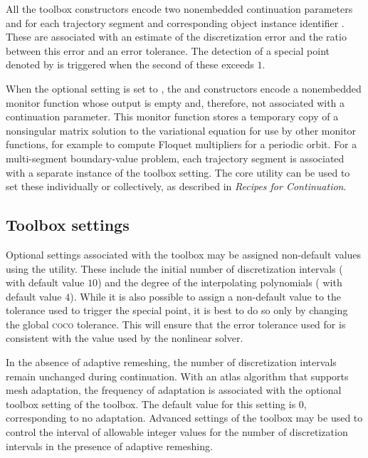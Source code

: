 All the  toolbox constructors encode two nonembedded continuation parameters  and  for each trajectory segment and corresponding object instance identifier . These are associated with an estimate of the discretization error and the ratio between this error and an error tolerance. The detection of  a special point denoted by  is triggered when the second of these exceeds $1$.

When the optional setting  is set to , the  and  constructors encode a nonembedded monitor function whose output is empty and, therefore, not associated with a continuation parameter. This monitor function stores a temporary copy of a nonsingular matrix solution to the variational equation for use by other monitor functions, for example to compute Floquet multipliers for a periodic orbit. For a multi-segment boundary-value problem, each trajectory segment is associated with a separate instance of the  toolbox setting. The  core utility can be used to set these individually or collectively, as described in \emph{Recipes for Continuation}.

\subsection{Toolbox settings}
Optional settings associated with the  toolbox may be assigned non-default values using the  utility. These include the initial number of discretization intervals ( with default value $10$) and the degree of the interpolating polynomials ( with default value $4$). While it is also possible to assign a non-default value to the tolerance used to trigger the  special point, it is best to do so only by changing the global \textsc{coco} tolerance. This will ensure that the error tolerance used for  is consistent with the value used by the nonlinear solver.

In the absence of adaptive remeshing, the number of discretization intervals remain unchanged during continuation. With an atlas algorithm that supports mesh adaptation, the frequency of adaptation is associated with the optional toolbox setting  of the  toolbox. The default value for this setting is $0$, corresponding to no adaptation. Advanced settings of the  toolbox may be used to control the interval of allowable integer values for the number of discretization intervals in the presence of adaptive remeshing.

